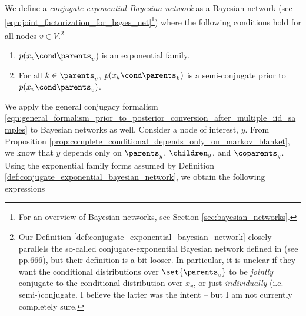 

\begin{definition}
We define a \textit{conjugate-exponential Bayesian network} as a Bayesian network (see \eqref{eqn:joint_factorization_for_bayes_net}\footnote{For an overview of Bayesian networks, see Section \ref{sec:bayesian_networks}.})  where the following conditions hold for all nodes $v \in V$.\footnote{Our Definition \ref{def:conjugate_exponential_bayesian_network} closely parallels the so-called conjugate-exponential Bayesian network defined in \cite{winn2005variational} (see pp.666), but their definition is a bit looser.  In particular, it is unclear if they want the conditional distributions over $\set{\parents_v}$ to be \textit{jointly} conjugate to the conditional distribution over $x_v$, or just \textit{individually} (i.e. semi-)conjugate.  I believe the latter was the intent -- but I am not currently completely sure.}  
\begin{enumerate}
\item $p(x_v \cond \parents_v$) is an exponential family.
\item For all $k \in \parents_v$, \; $p(x_k \cond \parents_k)$ is a semi-conjugate prior to $p(x_v \cond \parents_v)$.
\end{enumerate}
\label{def:conjugate_exponential_bayesian_network}
\end{definition}

We apply the general conjugacy formalism \eqref{eqn:general_formalism_prior_to_posterior_conversion_after_multiple_iid_samples} to Bayesian networks as well.  Consider a node of interest, $y$.  From Proposition \ref{prop:complete_conditional_depends_only_on_markov_blanket}, we know that $y$ depends only on $\parents_y$, $\children_y$, and $\coparents_y$.   Using the exponential family forms assumed by Definition \ref{def:conjugate_exponential_bayesian_network}, we obtain the following expressions

